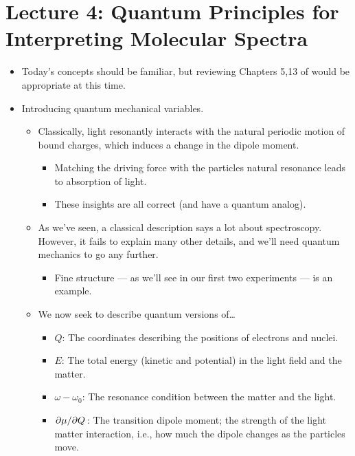 \documentclass[../notes.tex]{subfiles}
\begin{document}
\section{Lecture 4: Quantum Principles for Interpreting Molecular Spectra}
\begin{itemize}
    \item {}Today's concepts should be familiar, but reviewing Chapters 5,13 of \textcite{bib:McQuarrieSimon} would be appropriate at this time.
    \item Introducing quantum mechanical variables.
    \begin{itemize}
        \item Classically, light resonantly interacts with the natural periodic motion of bound charges, which induces a change in the dipole moment.
        \begin{itemize}
            \item Matching the driving force with the particles natural resonance leads to absorption of light.
            \item These insights are all correct (and have a quantum analog).
        \end{itemize}
        \item As we've seen, a classical description says a lot about spectroscopy. However, it fails to explain many other details, and we'll need quantum mechanics to go any further.
        \begin{itemize}
            \item Fine structure --- as we'll see in our first two experiments --- is an example.
        \end{itemize}
        \item We now seek to describe quantum versions of\dots
        \begin{itemize}
            \item $Q$: The coordinates describing the positions of electrons and nuclei.
            \item $E$: The total energy (kinetic and potential) in the light field and the matter.
            \item $\omega-\omega_0$: The resonance condition between the matter and the light.
            \item $\pdv*{\mu}{Q}$: The transition dipole moment; the strength of the light matter interaction, i.e., how much the dipole changes as the particles move.
        \end{itemize}
    \end{itemize}

\end{itemize}
\end{document}
